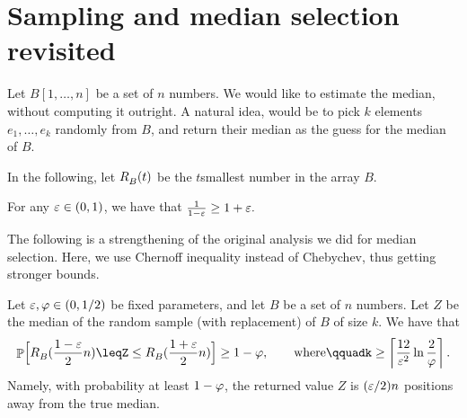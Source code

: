 
\section{Sampling and median selection revisited}

Let $B[1,\ldots, n]$ be a set of $n$ numbers. We would like to
estimate the median, without computing it outright. A natural idea,
would be to pick $k$ elements $e_1, \ldots, e_k$ randomly from $B$,
and return their median as the guess for the median of $B$.

\providecommand{\rankY}[2]{{R^{}_{#1}}\pth{#2}}%

In the following, let $\rankY{B}{t}$ be the $t$\th smallest number in
the array $B$.

\begin{observation}
    For any ${\varepsilon} \in (0,1)$, we have that
    \begin{math}
        \frac{1}{1-{\varepsilon}} \geq 1+{\varepsilon}.
    \end{math}
\end{observation}

The following is a strengthening of the original analysis we did for
median selection. Here, we use Chernoff inequality instead of Chebychev,
thus getting stronger bounds.

\begin{lemma}
    Let ${\varepsilon}, \varphi \in (0,1/2)$ be fixed parameters, and let $B$ be a set
    of $n$ numbers. Let $Z$ be the median of the random sample (with
    replacement) of $B$ of size $k$.  We have that
    \begin{equation*}
        \Prob{\Bigl. \rankY{B}{ \smash{\frac{1-\eps}{2}{n}}
           }
           \leq%
           Z%
           \leq%
           \rankY{B}{ \smash{\frac{1+\eps}{2} n}}%
        }
        \geq%
        1-\BadProb,
        \qquad\text{where}\qquad%
        k\geq \ceil{\frac{12}{ \eps^2} \ln \frac{2}{\BadProb}}.
    \end{equation*}
    Namely, with probability at least $1-\varphi$, the returned value
    $Z$ is $({\varepsilon}/2)n$ positions away from the true median.
\end{lemma}

